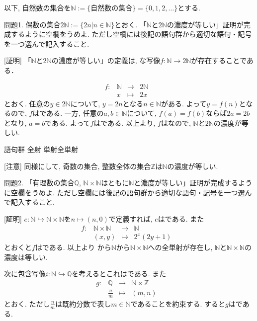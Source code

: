 \documentclass[dvipdfmx,a4paper,11pt]{article}
\newcommand{\Z}{\mathbb{Z}}
\newcommand{\Q}{\mathbb{Q}}
\newcommand{\N}{\mathbb{N}}
\theoremstyle{definition}
\begin{document}
以下, 自然数の集合を$\N:= \{ \text{自然数の集合}\} = \{ 0,1,2,\ldots\}$とする. 

問題1. 偶数の集合$2\N := \{ 2n | n \in \N \}$とおく. 「$\N$と$2\N$の濃度が等しい」証明が完成するように空欄をうめよ. 
ただし空欄には後記の語句群から適切な語句・記号を一つ選んで記入すること.

[証明]
「$\N$と$2\N$の濃度が等しい」の定義は, \boxed{\phantom{hogehoge}}な写像$f : \N \to 2\N$が存在することである．

  $$
\begin{array}{ccccc}
f: &\N& \rightarrow & 2\N& \\
&x& \longmapsto & 
2x
 &
\end{array}
$$
とおく.
任意の$y \in 2\N$について, $y=2n$となる$n \in \N$がある. よって$y=f(n)$となるので, $f$は\boxed{\phantom{hogehoge}}である.
一方, 任意の$a,b \in \N$について, $f(a)=f(b)$ならば$2a=2b$となり, $a=b$である. よって$f$は\boxed{\phantom{hogehoge}}である. 
以上より, $f$は\boxed{\phantom{hogehoge}}なので, $\N$と$2\N$の濃度が等しい.

\begin{itembox}[l]{語句群}
全射 \quad 単射\quad 全単射 
\end{itembox}

[注意] 同様にして, 奇数の集合, 整数全体の集合$\Z$は$\N$の濃度が等しい. 

\newpage
問題2. 「有理数の集合$\Q$, $\N \times \N$はともに$\N$と濃度が等しい」証明が完成するように空欄をうめよ. 
ただし空欄には後記の語句群から適切な語句・記号を一つ選んで記入すること.

[証明]
$e: \N \hookrightarrow \N \times \N$を$n \mapsto (n,0)$で定義すれば, $e$は\boxed{\phantom{hogehoge}}である.
また
  $$
\begin{array}{ccccc}
f: &\N \times \N& \rightarrow & \N& \\
&(x, y)& \longmapsto & 
2^{x}(2y+1)
 &
\end{array}
$$
とおくと$f$は\boxed{\phantom{hogehoge}}である. 以上より\boxed{\phantom{hogehoge}}
から$\N$から$\N \times \N$への全単射が存在し, $\N$と$\N \times \N$の濃度は等しい. 

次に包含写像$i : \N \hookrightarrow \Q$を考えるとこれは\boxed{\phantom{hogehoge}}である. 
また
  $$
\begin{array}{ccccc}
g: &\Q& \rightarrow & \N \times \Z& \\
&\frac{n}{m}& \longmapsto & 
(m,n)
 &
\end{array}
$$
とおく. ただし$\frac{n}{m}$は既約分数で表し$m \in \N$であることを約束する. 
すると$g$は\boxed{\phantom{hogehoge}}である.
\end{document}
